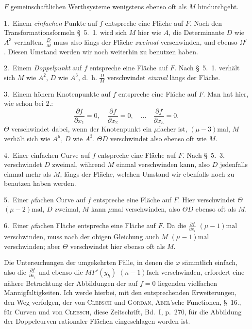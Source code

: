 \documentclass{article}
\begin{document}
$F$ gemeinschaftlichen Werthsysteme wenigstens ebenso oft als $M$ hindurchgeht.

1.~Einem \emph{einfachen} Punkte auf $f$ entspreche eine Fläche auf $F$. Nach den Transformationsformeln §~5.~1. wird sich $M$ hier wie $A$, die Determinante $D$ wie $A^3$ verhalten. $\frac{D}{M}$ muss also längs der Fläche \emph{zweimal} verschwinden, und ebenso $\Omega'$. Diesen Umstand werden wir noch weiterhin zu benutzen haben.

2.~Einem \emph{Doppelpunkt} auf $f$ entspreche eine Fläche auf $F$. Nach §~5.~1. verhält sich $M$ wie $A^2$, $D$ wie $A^3$, d.~h. $\frac{D}{M}$ verschwindet \emph{einmal} längs der Fläche.

3.~Einem höhern Knotenpunkte auf $f$ entspreche eine Fläche auf $F$. Man hat hier, wie schon bei 2.:
\[
\frac{\partial f}{\partial x_1} = 0, \quad \frac{\partial f}{\partial x_2} = 0, \quad \dots \quad \frac{\partial f}{\partial x_5} = 0.
\]
$\Theta$ verschwindet dabei, wenn der Knotenpunkt ein $\mu$facher ist, $(\mu - 3)\text{mal}$, $M$ verhält sich wie $A^\mu$, $D$ wie $A^3$. $\Theta D$ verschwindet also ebenso oft wie $M$.

4.~Einer einfachen Curve auf $f$ entspreche eine Fläche auf $F$. Nach §~5.~3. verschwindet $D$ zweimal, während $M$ einmal verschwinden kann, also $D$ jedenfalls einmal mehr als $M$, längs der Fläche, welchen Umstand wir ebenfalls noch zu benutzen haben werden.

5.~Einer $\mu$fachen Curve auf $f$ entspreche eine Fläche auf $F$. Hier verschwindet $\Theta$ $(\mu - 2)\text{mal}$, $D$ zweimal, $M$ kann $\mu\text{mal}$ verschwinden, also $\Theta D$ ebenso oft als $M$.

6.~Einer $\mu$fachen Fläche entspreche eine Fläche auf $F$. Da die $\frac{\partial f}{\partial x_i}$ $(\mu - 1)\text{mal}$ verschwinden, muss nach der obigen Gleichung auch $M$ $(\mu - 1)\text{mal}$ verschwinden; aber $\Theta$ verschwindet hier ebenso oft als $M$.

Die Untersuchungen der umgekehrten Fälle, in denen die $\varphi$ sämmtlich einfach, also die $\frac{\partial f}{\partial x_i}$ und ebenso die $M F'(y_h)$ $(n - 1)\text{fach}$ verschwinden, erfordert eine nähere Betrachtung der Abbildungen der auf $f = 0$ liegenden vielfachen Mannigfaltigkeiten. Ich werde hierbei, mit den entsprechenden Erweiterungen, den Weg verfolgen, der von \textsc{Clebsch} und \textsc{Gordan}, \textsc{Abel}'sche Functionen, §~16., für Curven und von \textsc{Clebsch}, diese Zeitschrift, Bd.~I, p.~270, für die Abbildung der Doppelcurven rationaler Flächen eingeschlagen worden ist.
\end{document}
